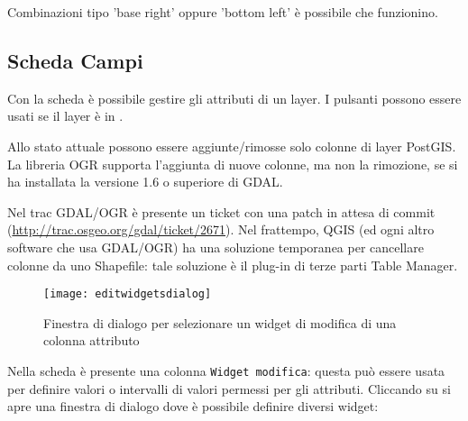 Combinazioni tipo 'base right' oppure 'bottom left' è possibile che funzionino.

\subsection{Scheda Campi}\label{label_attributes}

Con la scheda  è possibile gestire gli attributi di un layer. I pulsanti 
  
possono essere usati se il layer è in .

Allo stato attuale possono essere aggiunte/rimosse solo colonne di layer PostGIS. La libreria OGR 
supporta l'aggiunta di nuove colonne, ma non la rimozione, se si ha installata la versione 1.6 o 
superiore di GDAL.

Nel trac GDAL/OGR è presente un ticket con una patch in attesa di commit (\url{http://trac.osgeo.org/gdal/ticket/2671}). 
Nel frattempo, QGIS (ed ogni altro software che usa GDAL/OGR) ha una soluzione temporanea per cancellare 
colonne da uno Shapefile: tale soluzione è il plug-in di terze parti Table Manager.


\begin{figure}[H]
   \begin{center}
   \caption{Finestra di dialogo per selezionare un widget di modifica di una colonna attributo \nixcaption}\label{fig:editwidget}\smallskip
   \texttt{[image: editwidgetsdialog]}
\end{center}
\end{figure}

Nella scheda  è presente una colonna \texttt{Widget modifica}: questa può essere usata per definire 
valori o intervalli di valori permessi per gli attributi. Cliccando su  si apre una finestra 
di dialogo dove è possibile definire diversi widget:


